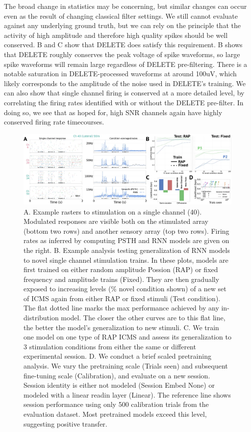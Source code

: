 \documentclass[12pt,oneside]{report}
\begin{document}
The broad change in statistics may be concerning, but similar changes can occur even as the result of changing classical filter settings. We still cannot evaluate against any underlying ground truth, but we can rely on the principle that the activity of high amplitude and therefore high quality spikes should be well conserved. B and C show that DELETE does satisfy this requirement. B shows that DELETE roughly conserves the peak voltage of spike waveforms, so large spike waveforms will remain large regardless of DELETE pre-filtering. There is a notable saturation in DELETE-processed waveforms at around 100uV, which likely corresponds to the amplitude of the noise used in DELETE’s training. We can also show that single channel firing is conserved at a more detailed level, by correlating the firing rates identified with or without the DELETE pre-filter. In doing so, we see that as hoped for, high SNR channels again have highly conserved firing rate timecourses.



\begin{figure}[h]
  \centering
  \includegraphics[width=1.0\linewidth]{ch4_icms_taxonomy.png}
  \caption{A. Example rasters to stimulation on a single channel (40). Modulated responses are visible both on the stimulated array (bottom two rows) and another sensory array (top two rows). Firing rates as inferred by computing PSTH and RNN models are given on the right. B. Example analysis testing generalization of RNN models to novel single channel stimulation trains. In these plots, models are first trained on either random amplitude Possion (RAP) or fixed frequency and amplitude trains (Fixed). They are then gradually exposed to increasing levels (\% novel condition shown) of a new set of ICMS again from either RAP or fixed stimuli (Test condition). The flat dotted line marks the max performance achieved by any in-distribution model. The closer the other curves are to this flat line, the better the model's generalization to new stimuli. C. We train one model on one type of RAP ICMS and assess its generalization to 3 stimulation conditions from either the same or different experimental session. D. We conduct a brief scaled pretraining analysis. We vary the pretraining scale (Trials seen) and subsequent fine-tuning scale (Calibration), and evaluate on a new session. Session identity is either not modeled (Session Embed None) or modeled with a linear readin layer (Linear). The reference line shows session performance using only 500 calibration trials from the evaluation dataset. Most pretrained models exceed this level, suggesting positive transfer.}
  \label{fig:icms_taxonomy}
\end{figure}
\end{document}
